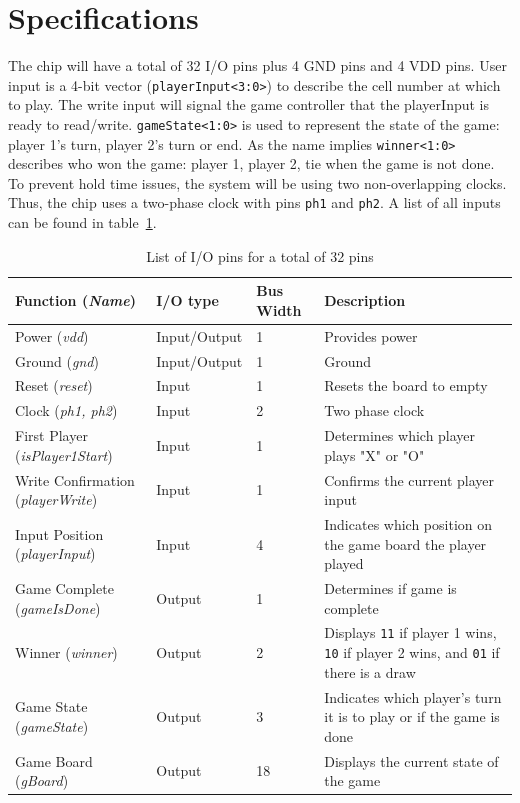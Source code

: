\documentclass[]{article}
\begin{document}
\section{Specifications}
\label{specifications}
The chip will have a total of 32 I/O pins plus 4 GND pins and 4 VDD pins.
User input is a 4-bit vector (\texttt{playerInput<3:0>}) to describe the cell number at which to play. The write input will signal the game controller that the playerInput is ready to read/write. \texttt{gameState<1:0>} is used to represent the state of the game: player 1's turn, player 2's turn or end. As the name implies \texttt{winner<1:0>} describes who won the game: player 1, player 2, tie when the game is not done. To prevent hold time issues, the system will be using two non-overlapping clocks. Thus, the chip uses a two-phase clock with pins \texttt{ph1} and \texttt{ph2}. A list of all inputs can be found in table~\ref{tab:io-list}.


\begin{table}
\centering
\caption{List of I/O pins for a total of 32 pins}
\begin{tabular}{ | l | l | l | p{5cm} |}
\hline
    Function (\emph{Name})               & I/O type     & Bus Width & Description \\
\hline
    Power (\emph {vdd})                  & Input/Output & 1         & Provides power \\
\hline
    Ground (\emph{gnd})                  & Input/Output & 1         & Ground \\
\hline
    Reset (\emph{reset})                 & Input        & 1         & Resets the board to empty \\
\hline 
    Clock (\emph{ph1, ph2})              & Input        & 2         & Two phase clock\\
\hline
    First Player (\emph{isPlayer1Start}) & Input        & 1         & Determines which player plays "X" or "O" \\
\hline
    Write Confirmation (\emph{playerWrite}) & Input     & 1         & Confirms the current player input \\
\hline
    Input Position (\emph{playerInput})    & Input      & 4         & Indicates which position on the game board the player played \\
\hline
    Game Complete (\emph{gameIsDone})      & Output     & 1         & Determines if game is complete \\
\hline
    Winner (\emph{winner}) & Output & 2 & Displays \texttt{11} if player 1 wins, \texttt{10} if player 2 wins, and \texttt{01} if there is a draw \\
\hline
    Game State (\emph{gameState}) & Output              & 3         & Indicates which player's turn it is to play or if the game is done\\
\hline
    Game Board (\emph{gBoard})              & Output     & 18        & Displays the current state of the game \\
    \hline
\end{tabular}

\label{tab:io-list}
\end{table}
\end{document}
